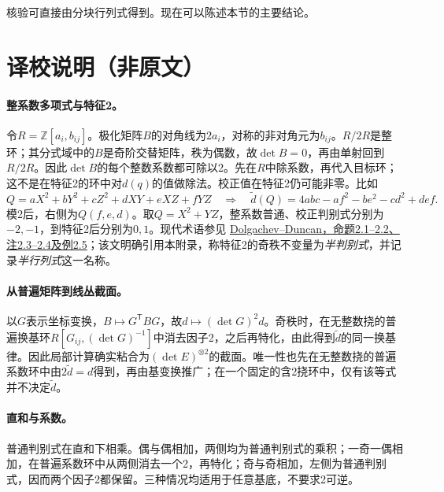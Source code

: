 \documentclass[openany,fontset=fandol]{ctexbook}
\begin{document}
核验可直接由分块行列式得到。现在可以陈述本节的主要结论。

\section*{译校说明（非原文）}
\begingroup\small
\paragraph{整系数多项式与特征2。}
令$R=\mathbb Z[a_i,b_{ij}]$。极化矩阵$B$的对角线为$2a_i$，对称的非对角元为$b_{ij}$。$R/2R$是整环；其分式域中的$B$是奇阶交替矩阵，秩为偶数，故$\det B=0$，再由单射回到$R/2R$。因此$\det B$的每个整数系数都可除以2。先在$R$中除系数，再代入目标环；这不是在特征2的环中对$d(q)$的值做除法。校正值在特征2仍可能非零。比如
\[
Q=aX^2+bY^2+cZ^2+dXY+eXZ+fYZ
\quad\Longrightarrow\quad
\widetilde d(Q)=4abc-af^2-be^2-cd^2+def .
\]
模2后，右侧为$Q(f,e,d)$。取$Q=X^2+YZ$，整系数普通、校正判别式分别为$-2,-1$，到特征2后分别为$0,1$。现代术语参见 \href{https://doi.org/10.2140/ant.2018.12.99}{Dolgachev--Duncan，命题2.1--2.2、注2.3--2.4及例2.5}；该文明确引用本附录，称特征2的奇秩不变量为\emph{半判别式}，并记录\emph{半行列式}这一名称。

\paragraph{从普遍矩阵到线丛截面。}
以$G$表示坐标变换，$B\mapsto G^{\mathsf T}BG$，故$d\mapsto(\det G)^2d$。奇秩时，在无整数挠的普遍换基环$R[G_{ij},(\det G)^{-1}]$中消去因子2，之后再特化，由此得到$\widetilde d$的同一换基律。因此局部计算确实粘合为$(\det E)^{\otimes2}$的截面。唯一性也先在无整数挠的普遍系数环中由$2\widetilde d=d$得到，再由基变换推广；在一个固定的含2挠环中，仅有该等式并不决定$\widetilde d$。

\paragraph{直和与系数。}
普通判别式在直和下相乘。偶与偶相加，两侧均为普通判别式的乘积；一奇一偶相加，在普遍系数环中从两侧消去一个2，再特化；奇与奇相加，左侧为普通判别式，因而两个因子2都保留。三种情况均适用于任意基底，不要求2可逆。
\par\endgroup
\end{document}
